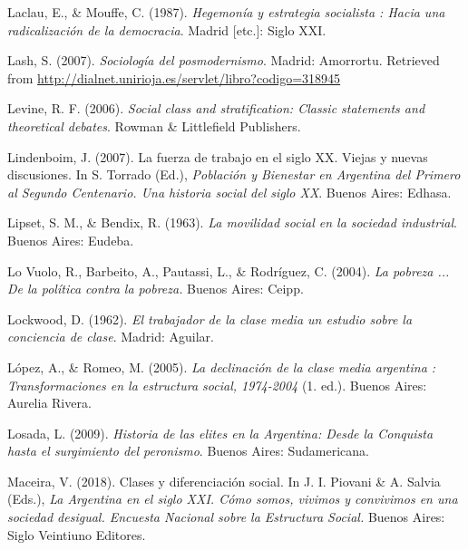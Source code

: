 \documentclass[
]{article}
\newlength{\cslhangindent}
\newlength{\cslentryspacingunit} %
\newenvironment{CSLReferences}[2] %
 {%
  \setlength{\parindent}{0pt}
  \ifodd #1
  \let\oldpar\par
  \def\par{\hangindent=\cslhangindent\oldpar}
  \fi
  \setlength{\parskip}{#2\cslentryspacingunit}
 }%
 {}
\begin{document}
\begin{CSLReferences}{1}{0}
\leavevmode{}%
Laclau, E., \& Mouffe, C. (1987). \emph{Hegemonía y estrategia socialista : Hacia una radicalización de la democracia}. Madrid {[}etc.{]}: Siglo XXI.

\leavevmode{}%
Lash, S. (2007). \emph{Sociología del posmodernismo}. Madrid: Amorrortu. Retrieved from \url{http://dialnet.unirioja.es/servlet/libro?codigo=318945}

\leavevmode{}%
Levine, R. F. (2006). \emph{Social class and stratification: Classic statements and theoretical debates}. Rowman \& Littlefield Publishers.

\leavevmode{}%
Lindenboim, J. (2007). La fuerza de trabajo en el siglo {XX}. {Viejas} y nuevas discusiones. In S. Torrado (Ed.), \emph{Población y {Bienestar} en {Argentina} del {Primero} al {Segundo} {Centenario}. {Una} historia social del siglo {XX}}. Buenos Aires: Edhasa.

\leavevmode{}%
Lipset, S. M., \& Bendix, R. (1963). \emph{La movilidad social en la sociedad industrial}. Buenos Aires: Eudeba.

\leavevmode{}%
Lo Vuolo, R., Barbeito, A., Pautassi, L., \& Rodríguez, C. (2004). \emph{La pobreza ... De la política contra la pobreza.} Buenos Aires: Ceipp.

\leavevmode{}%
Lockwood, D. (1962). \emph{El trabajador de la clase media un estudio sobre la conciencia de clase}. Madrid: Aguilar.

\leavevmode{}%
López, A., \& Romeo, M. (2005). \emph{La declinación de la clase media argentina : Transformaciones en la estructura social, 1974-2004} (1. ed.). Buenos Aires: Aurelia Rivera.

\leavevmode{}%
Losada, L. (2009). \emph{Historia de las elites en la {Argentina}: Desde la {Conquista} hasta el surgimiento del peronismo}. Buenos Aires: Sudamericana.

\leavevmode{}%
Maceira, V. (2018). Clases y diferenciación social. In J. I. Piovani \& A. Salvia (Eds.), \emph{La {Argentina} en el siglo {XXI}. {Cómo} somos, vivimos y convivimos en una sociedad desigual. {Encuesta} {Nacional} sobre la {Estructura} {Social}.} Buenos Aires: Siglo Veintiuno Editores.


\end{CSLReferences}
\end{document}
